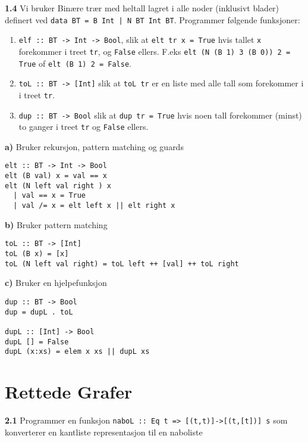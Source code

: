 \documentclass{article}
\begin{document}
\textbf{1.4} Vi bruker Binære trær med heltall lagret i alle noder (inklusivt blader) definert ved \texttt{data BT = B Int | N BT Int BT}. Programmer følgende funksjoner:

\begin{enumerate}[label=\alph*)]
    \item \texttt{elf :: BT -> Int -> Bool}, slik at \texttt{elt tr x = True} hvis tallet \texttt{x} forekommer i treet \texttt{tr}, og \texttt{False} ellers. F.eks \texttt{elt (N (B 1) 3 (B 0)) 2 = True} of \texttt{elt (B 1) 2 = False}.
    \item \texttt{toL :: BT -> [Int]} slik at \texttt{toL tr} er en liste med alle tall som forekommer i i treet \texttt{tr}.
    \item \texttt{dup :: BT -> Bool} slik at \texttt{dup tr = True} hvis noen tall forekommer (minst) to ganger i treet \texttt{tr} og \texttt{False} ellers.
\end{enumerate}

\begin{ans}
    \textbf{a)} Bruker rekursjon, pattern matching og guards
    \begin{lstlisting}
elt :: BT -> Int -> Bool
elt (B val) x = val == x
elt (N left val right ) x
  | val == x = True
  | val /= x = elt left x || elt right x
\end{lstlisting}
\bigskip

    \textbf{b)} Bruker pattern matching
    \begin{lstlisting}
toL :: BT -> [Int]
toL (B x) = [x]
toL (N left val right) = toL left ++ [val] ++ toL right
    \end{lstlisting}

    \textbf{c)} Bruker en hjelpefunksjon
    \begin{lstlisting}
dup :: BT -> Bool
dup = dupL . toL

dupL :: [Int] -> Bool
dupL [] = False
dupL (x:xs) = elem x xs || dupL xs
    \end{lstlisting}
\end{ans}

\section{Rettede Grafer}
\textbf{2.1} Programmer en funksjon \texttt{naboL :: Eq t => [(t,t)]->[(t,[t])] s} som konverterer en kantliste representasjon til en naboliste
\end{document}
